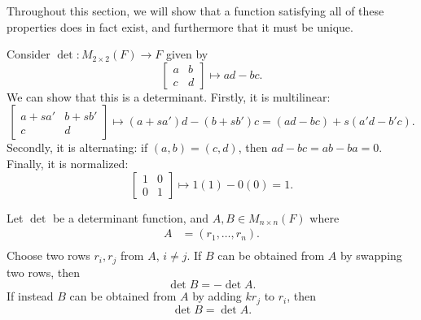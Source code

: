 Throughout this section, we will show that a function satisfying all of these properties does in fact exist, and furthermore that it must be unique.

\begin{exmp}
    Consider $\det: M_{2 \times 2}(F) \to F$ given by
    \[\begin{bmatrix}
        a & b \\ c & d
    \end{bmatrix} \mapsto ad - bc.\]
    We can show that this is a determinant. Firstly, it is multilinear:
    \[\begin{bmatrix}
        a + sa' & b + sb' \\ c & d
    \end{bmatrix} \mapsto (a + sa')d - (b + sb')c = \left(ad - bc\right) + s\left(a'd - b'c\right).\]
    Secondly, it is alternating: if $(a, b) = (c, d)$, then $ad - bc = ab - ba = 0$. Finally, it is normalized:
    \[\begin{bmatrix}
        1 & 0 \\ 0 & 1
    \end{bmatrix} \mapsto 1(1) - 0(0) = 1.\]
\end{exmp}

\begin{prop}\label{det-row-ops}
    Let $\det$ be a determinant function, and $A, B \in M_{n \times n}(F)$ where
    \begin{align*}
        A &= (r_1, \ldots, r_n). \\
    \end{align*}
    Choose two rows $r_i, r_j$ from $A$, $i \neq j$.
    If $B$ can be obtained from $A$ by swapping two rows, then
    \begin{equation}\label{det-row-swap}\tag{$1$}
        \det B = -\det A.
    \end{equation}
    If instead $B$ can be obtained from $A$ by adding $kr_j$ to $r_i$, then
    \begin{equation}\label{det-add-multiple}\tag{$2$}
        \det B = \det A.
    \end{equation}
\end{prop}

